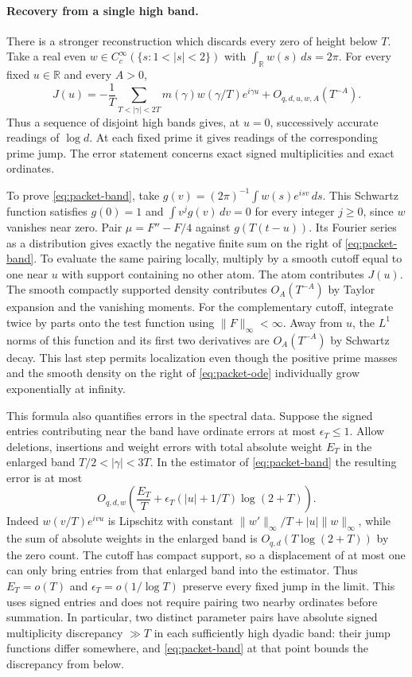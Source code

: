 \paragraph{Recovery from a single high band.}
There is a stronger reconstruction which discards every zero of height
below $T$. Take a real even $w\in C_c^\infty(\{s:1<|s|<2\})$ with
$\int_{\mathbb R} w(s)\,ds=2\pi$. For every fixed $u\in\mathbb R$
and every $A>0$,
\begin{equation}
 J(u)=-\frac1T\sum_{T<|\gamma|<2T}
          m(\gamma) w(\gamma/T)e^{i\gamma u}
       +O_{q,d,u,w,A}(T^{-A}).
 \label{eq:packet-band}
\end{equation}
Thus a sequence of disjoint high bands gives, at $u=0$, successively
accurate readings of $\log d$. At each fixed prime it gives readings of
the corresponding prime jump. The error statement concerns exact signed
multiplicities and exact ordinates.

To prove \eqref{eq:packet-band}, take
$g(v)=(2\pi)^{-1}\int w(s)e^{isv}\,ds$. This Schwartz function satisfies
$g(0)=1$ and $\int v^j g(v)\,dv=0$ for every integer $j\ge0$, since $w$
vanishes near zero. Pair $\mu=F''-F/4$ against $g(T(t-u))$.
Its Fourier series as a distribution gives exactly the negative finite
sum on the right of \eqref{eq:packet-band}. To evaluate the same pairing
locally, multiply by a smooth cutoff equal to one near $u$ with support
containing no other atom. The atom contributes $J(u)$. The smooth compactly
supported density contributes $O_A(T^{-A})$ by Taylor expansion and the
vanishing moments. For the complementary cutoff, integrate twice by parts
onto the test function using $\lVert F\rVert_\infty<\infty$.
Away from $u$, the $L^1$ norms of this function and its first two derivatives
are $O_A(T^{-A})$ by Schwartz decay. This last step permits localization
even though the positive prime masses and the smooth density on the
right of \eqref{eq:packet-ode} individually grow exponentially at infinity.

This formula also quantifies errors in the spectral data. Suppose the signed
entries contributing near the band have ordinate errors at most
$\epsilon_T\le1$. Allow deletions, insertions and weight errors with total
absolute weight $E_T$ in the enlarged band $T/2<|\gamma|<3T$.
In the estimator of \eqref{eq:packet-band} the resulting error is at most
\[
 O_{q,d,w}\!\left(\frac{E_T}{T}
       +\epsilon_T (|u|+1/T)\log(2+T)\right).
\]
Indeed $w(v/T)e^{ivu}$ is Lipschitz with constant
$\lVert w'\rVert_\infty/T+|u|\lVert w\rVert_\infty$, while the sum of
absolute weights in the enlarged band is $O_{q,d}(T\log(2+T))$ by the
zero count. The cutoff has compact support, so a displacement of at most
one can only bring entries from that enlarged band into the estimator.
Thus $E_T=o(T)$ and $\epsilon_T=o(1/\log T)$ preserve every fixed jump
in the limit. This uses signed entries and does not require pairing two
nearby ordinates before summation. In particular, two distinct parameter
pairs have absolute signed multiplicity discrepancy $\gg T$ in each
sufficiently high dyadic band: their jump functions differ somewhere, and
\eqref{eq:packet-band} at that point bounds the discrepancy from below.
